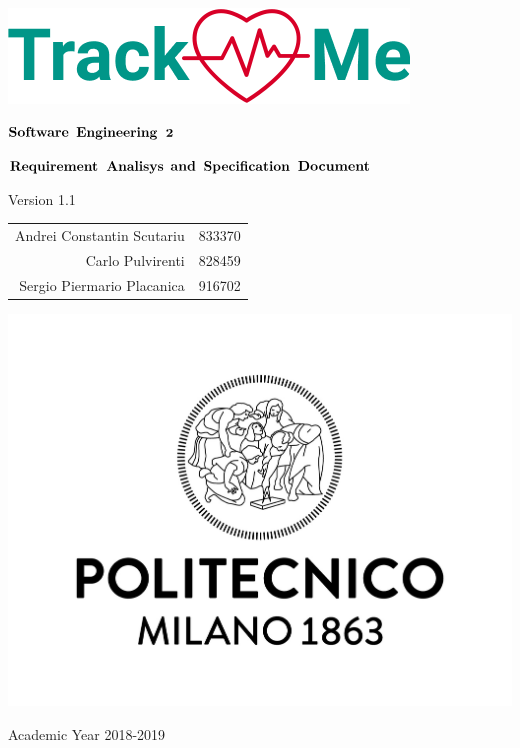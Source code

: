 \documentclass{article}
\author{
\and
\and
}
\date{}
\title{}
\begin{document}

\thispagestyle{empty} %
\begin{center}
	\includegraphics[scale=0.8]{images/mockup/logo2.png}



	\vspace{3cm}

	\large $\bf \large Software$ $\bf Engineering$ $\bf 2$

	\vspace{3mm}

	\LARGE $\bf Requirement$  $\bf Analisys$ $\bf and$ $\bf Specification$ $\bf Document$

	\vspace{2mm}
	\small Version 1.1

	\vspace{1cm}

	\begin{tabular}{r|l}
		\large Andrei Constantin Scutariu & \large 833370\\
		\large Carlo Pulvirenti & \large 828459\\
		\large Sergio Piermario Placanica & \large 916702\\
	\end{tabular}

	\vspace{3cm}

	\includegraphics[scale=0.15]{images/logoPolimi.jpg}

	\vspace{3mm}
	Academic Year 2018-2019


	\end{center}
\end{document}
